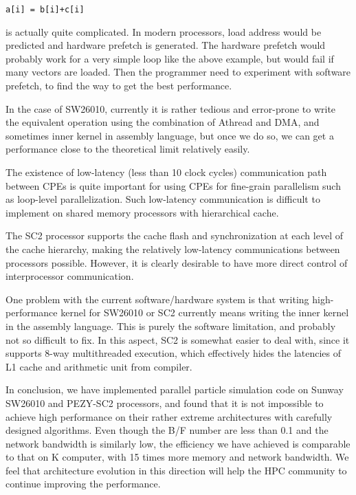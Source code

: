 \documentclass[conference]{IEEEtran}
\begin{document}
{\tt a[i] =   b[i]+c[i]}

is actually quite complicated. In modern processors, load address
would be predicted and hardware prefetch is generated. The hardware
prefetch would probably work for a very simple loop like the above
example, but would fail if many vectors are loaded. Then the
programmer need to experiment with software prefetch, to find the way
to get  the best performance. 

In the case of SW26010, currently it is rather tedious and error-prone
to write the equivalent operation using the combination of Athread and
DMA, and sometimes inner kernel in assembly language, but once we do
so, we can get a performance close to the theoretical limit
relatively easily.

The existence of low-latency (less than 10 clock cycles) communication
path between CPEs is quite important for using CPEs for fine-grain
parallelism such as loop-level parallelization. Such low-latency
communication is difficult to implement on shared memory processors
with hierarchical cache.

The SC2 processor supports the cache flash and
synchronization at each level of the cache hierarchy, making the
relatively low-latency communications between processors possible.
However, it is clearly desirable to have  more direct control of
interprocessor communication.

One  problem with the current software/hardware system is that writing
high-performance kernel for SW26010 or SC2  currently means writing the inner
kernel in the assembly language. This is purely the software limitation,
and probably not so difficult to fix. In this aspect, SC2 is somewhat
easier to deal with, since it supports 8-way multithreaded execution,
which effectively hides the latencies of L1 cache and arithmetic unit
from compiler. 



In conclusion, we have implemented parallel particle simulation code
on Sunway SW26010 and PEZY-SC2 processors, and found that it is not
impossible to achieve high performance on their rather extreme
architectures with carefully designed algorithms. Even though the B/F
number are less than 0.1  and the network bandwidth is similarly low, the efficiency we
have achieved is comparable to that on K computer, with 15
times more memory and network bandwidth. We feel that architecture
evolution in this direction will help the HPC community to continue
improving the performance.
\end{document}
